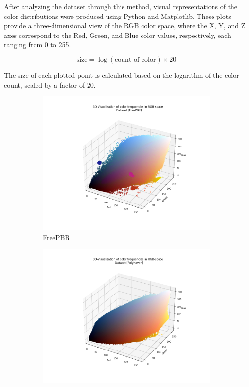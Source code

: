     After analyzing the dataset through this method, visual representations of the color distributions were produced using Python and Matplotlib. These plots provide a three-dimensional view of the RGB color space, where the X, Y, and Z axes correspond to the Red, Green, and Blue color values, respectively, each ranging from 0 to 255. 

    \[
    \text{size} = \log(\text{count of color}) \times 20
    \]

    The size of each plotted point is calculated based on the logarithm of the color count, scaled by a factor of 20.
    
    

    \begin{figure}[h]
        \centering
        
        \begin{subfigure}{.33\textwidth}
          \centering
          \includegraphics[width=\linewidth]{../code/dataAnalysis/output/FreePBR.png}
          \caption{FreePBR}
          \label{fig:dataset-FreePBR}
        \end{subfigure}%
        \hfill
        \begin{subfigure}{.33\textwidth}
          \centering
          \includegraphics[width=\linewidth]{../code/dataAnalysis/output/Polyhaven.png}

\end{subfigure}
\end{figure}
